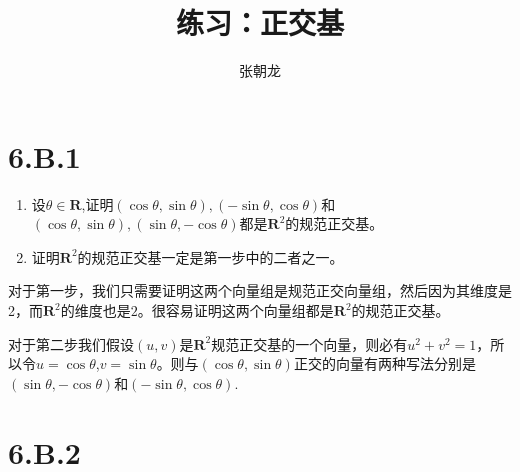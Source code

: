 \documentclass[10pt,a4paper,UTF8]{article}
\author{张朝龙}
\date{}
\title{练习：正交基}
\begin{document}
\maketitle
\tableofcontents
{}

\section{6.B.1}
\label{sec:org40dbcf4}


\begin{tikzproblem}
\begin{enumerate}
\item 设\(\theta\in \mathbf{R}\),证明\((\cos\theta,\sin\theta),(-\sin\theta,\cos\theta)\)和\((\cos\theta,\sin\theta),(\sin\theta,-\cos\theta)\)都是\(\mathbf{R}^{2}\)的规范正交基。
\item 证明\(\mathbf{R}^{2}\)的规范正交基一定是第一步中的二者之一。
\end{enumerate}
\end{tikzproblem}

\begin{tikzanswer}
对于第一步，我们只需要证明这两个向量组是规范正交向量组，然后因为其维度是2，而\(\mathbf{R}^{2}\)的维度也是\(2\)。很容易证明这两个向量组都是\(\mathbf{R}^{2}\)的规范正交基。

对于第二步我们假设\((u,v)\)是\(\mathbf{R}^{2}\)规范正交基的一个向量，则必有\(u^{2} + v^{2} = 1\)，所以令\(u=\cos\theta\),\(v=\sin\theta\)。则与\((\cos\theta,\sin\theta)\)正交的向量有两种写法分别是\((\sin\theta,-\cos\theta)\)和\((-\sin\theta,\cos\theta)\).
\end{tikzanswer}
\section{6.B.2}
\label{sec:org40a3f30}
\end{document}

